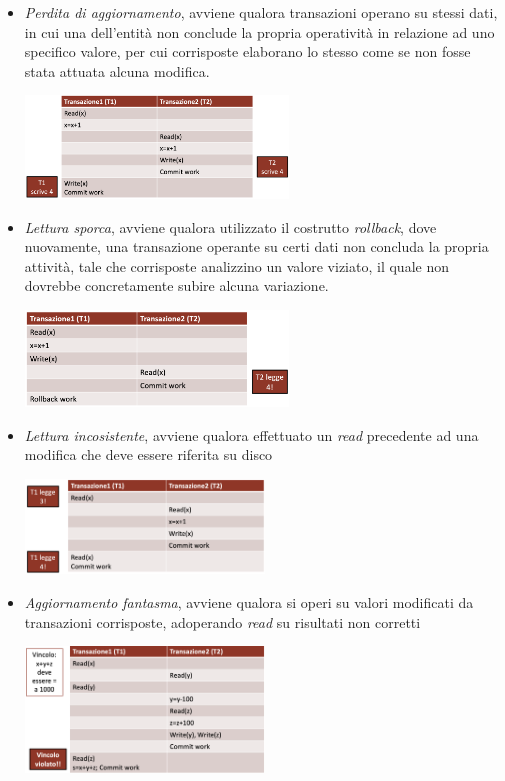 \documentclass{article}
\begin{document}
\begin{itemize}[label={-}]
    \itemsep0em
    \item \textit{Perdita di aggiornamento}, avviene qualora transazioni operano su stessi dati, in cui una dell'entità non conclude la propria operatività in relazione ad uno specifico valore, per cui corrisposte elaborano lo stesso come se non fosse stata attuata alcuna modifica. 
    \begin{center}
        \includegraphics*[width=0.55\textwidth]{foto 1.png}
    \end{center}
    \item \textit{Lettura sporca}, avviene qualora utilizzato il costrutto \textit{rollback}, dove nuovamente, una transazione operante su certi dati non concluda la propria attività, tale che corrisposte analizzino un valore viziato, il quale non dovrebbe concretamente subire alcuna variazione.
    \begin{center}
        \includegraphics*[width=0.55\textwidth]{foto 2.png}
    \end{center}
    \item \textit{Lettura incosistente}, avviene qualora effettuato un \textit{read} precedente ad una modifica che deve essere riferita su disco
    \begin{center}
        \includegraphics*[width=0.5\textwidth]{foto 3.png}
    \end{center}
    \item \textit{Aggiornamento fantasma}, avviene qualora si operi su valori modificati da transazioni corrisposte, adoperando \textit{read} su risultati non corretti  
    \begin{center}
        \includegraphics*[width=0.5\textwidth]{foto 4.png}
    \end{center}
\end{itemize}
\end{document}
